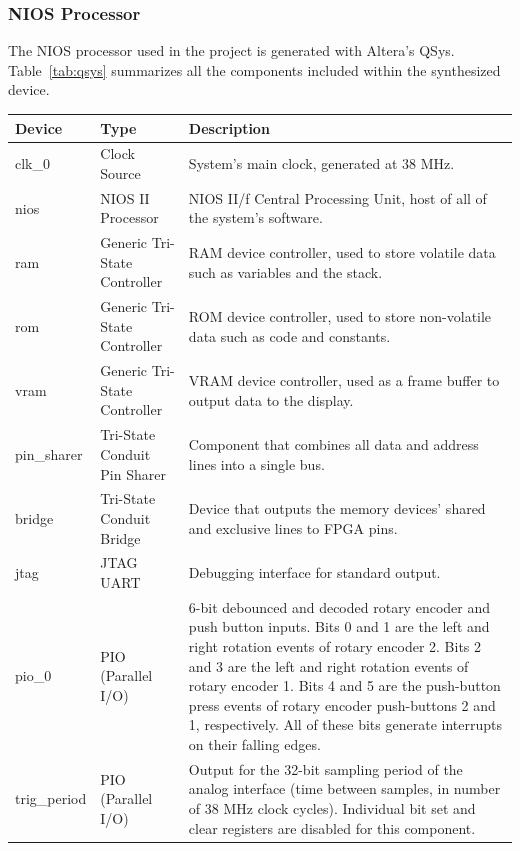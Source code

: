 \documentclass[titlepage]{scrartcl}
\begin{document}
	\clearpage
	
	\subsubsection{NIOS Processor}
	The NIOS processor used in the project is generated with Altera's QSys. Table~\ref{tab:qsys} summarizes all the components included within the synthesized device.\\

	\begin{table}
	  \begin{center}
    		\begin{tabular}{|p{2cm} | p{4cm} | p{10cm} |}
		 \hline
		 \textbf{Device} & \textbf{Type} & \textbf{Description}\\
		 \hline
		 clk\_0 & Clock Source & System's main clock, generated at 38 MHz. \\ \hline
		 nios & NIOS II Processor & NIOS II/f Central Processing Unit, host of all of the system's software.\\ \hline
		 ram & Generic Tri-State Controller & RAM device controller, used to store volatile data such as variables and the stack.\\ \hline
		 rom & Generic Tri-State Controller & ROM device controller, used to store non-volatile data such as code and constants.\\ \hline
		 vram & Generic Tri-State Controller & VRAM device controller, used as a frame buffer to output data to the display.\\ \hline
		 pin\_sharer & Tri-State Conduit Pin Sharer & Component that combines all data and address lines into a single bus.\\ \hline
		 bridge & Tri-State Conduit Bridge & Device that outputs the memory devices' shared and exclusive lines to FPGA pins.\\ \hline
		jtag & JTAG UART & Debugging interface for standard output.\\ \hline
		 pio\_0 & PIO (Parallel I/O) & 6-bit debounced and decoded rotary encoder and push button inputs. Bits 0 and 1 are the left and right rotation events of rotary encoder 2. Bits 2 and 3 are the left and right rotation events of rotary encoder 1. Bits 4 and 5 are the push-button press events of rotary encoder push-buttons 2 and 1, respectively. All of these bits generate interrupts on their falling edges.\\ \hline
		trig\_period & PIO (Parallel I/O) & Output for the 32-bit sampling period of the analog interface (time between samples, in number of 38 MHz clock cycles). Individual bit set and clear registers are disabled for this component.\\ \hline

\end{tabular}
\end{center}
\end{table}
\end{document}
